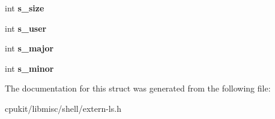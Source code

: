 \begin{DoxyCompactItemize}
\mbox{\label{structDISPLAY_a75fcce17e09a2ebd5aa11fa297c5239a}} 
int {\bfseries s\+\_\+size}
\item 
\mbox{\label{structDISPLAY_a6a4c6cfaa54fff0d9917031f4b4ec5cd}} 
int {\bfseries s\+\_\+user}
\item 
\mbox{\label{structDISPLAY_a15aa0f250755a78bdf745957ea3c602e}} 
int {\bfseries s\+\_\+major}
\item 
\mbox{\label{structDISPLAY_a90f363ed0b4676a1ccc2ea903239a105}} 
int {\bfseries s\+\_\+minor}
\end{DoxyCompactItemize}


The documentation for this struct was generated from the following file\+:\begin{DoxyCompactItemize}
\item 
cpukit/libmisc/shell/extern-\/ls.\+h\end{DoxyCompactItemize}
